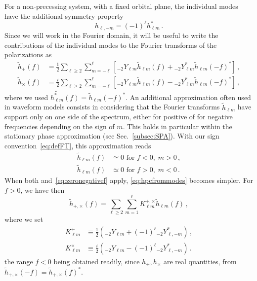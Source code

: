 \documentclass[aps,showpacs,twocolumn,
prd,superscriptaddress,nofootinbib]{revtex4-1}
\newcommand{\be}{\begin{equation}}
\newcommand{\ee}{\end{equation}}
\newcommand{\nn}{\nonumber}
\begin{document}
For a non-precessing system, with a fixed orbital plane, the individual modes have the additional symmetry property
\be\label{eq:symmetryhlminusm}
	h_{\ell, -m} = (-1)^{\ell} h_{\ell m}^{*} \,.
\ee
Since we will work in the Fourier domain, it will be useful to write the contributions of the individual modes to the Fourier transforms of the polarizations as
\begin{subequations}\label{eq:hpcfrommodes}
\begin{align}
	\tilde{h}_{+}(f) &= \frac{1}{2} \sum\limits_{\ell \geq 2} \sum\limits_{m=-\ell}^{\ell} \left[ {}_{-2}Y_{\ell m} \tilde{h}_{\ell m}(f) + {}_{-2}Y_{\ell m}^{*} \tilde{h}_{\ell m}(-f)^{*} \right] \,, \\
	\tilde{h}_{\times}(f) &= \frac{i}{2} \sum\limits_{\ell \geq 2} \sum\limits_{m=-\ell}^{\ell} \left[ {}_{-2}Y_{\ell m} \tilde{h}_{\ell m}(f) - {}_{-2}Y_{\ell m}^{*} \tilde{h}_{\ell m}(-f)^{*} \right] \,,
\end{align}
\end{subequations}
where we used $\widetilde{h_{\ell m}^{*}}(f) = \tilde{h}_{\ell m}(-f)^{*}$. An additional approximation often used in waveform models consists in considering that the Fourier transforms $\tilde{h}_{\ell m}$ have support only on one side of the spectrum, either for positive of for negative frequencies depending on the sign of $m$. This holds in particular within the stationary phase approximation (see Sec.~\ref{subsec:SPA}). With our sign convention~\eqref{eq:defFT}, this approximation reads
\begin{align}\label{eq:zeronegativef}
	\tilde{h}_{\ell m} (f) &\simeq 0 \text{ for } f<0, \; m>0 \nn\,,\\
	\tilde{h}_{\ell m} (f) &\simeq 0 \text{ for } f>0, \; m<0 \,.
\end{align}
When both and~\eqref{eq:zeronegativef} apply, \eqref{eq:hpcfrommodes} becomes simpler. For $f>0$, we have then
\be
	\tilde{h}_{+,\times} (f) = \sum_{\ell \geq 2} \sum_{m = 1}^{\ell} K^{+,\times}_{\ell m} \tilde{h}_{\ell m}(f) \,,
\ee
where we set
\begin{align}
	K^{+}_{\ell m} &\equiv \frac{1}{2} \left( {}_{-2}Y_{\ell m} + (-1)^{\ell} {}_{-2}Y_{\ell, -m}^{*} \right) \,, \nn\\
	K^{\times}_{\ell m} &\equiv \frac{i}{2} \left( {}_{-2}Y_{\ell m} - (-1)^{\ell} {}_{-2}Y_{\ell, -m}^{*} \right) \,.
\end{align}
the range $f<0$ being obtained readily, since $h_{+},h_{\times}$ are real quantities, from $\tilde{h}_{+,\times} (-f) = \tilde{h}_{+,\times}(f)^{*}$.
\end{document}
